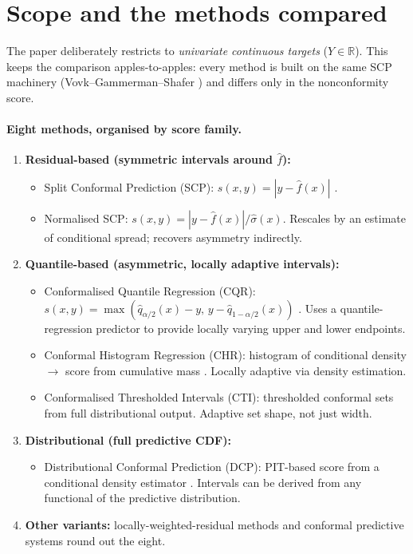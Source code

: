 \documentclass[letterpaper,11pt,leqno]{article}
\begin{document}
\section{Scope and the methods compared}\label{s:scope}

The paper deliberately restricts to \emph{univariate continuous targets} ($Y \in \mathbb{R}$). This keeps the comparison apples-to-apples: every method is built on the same SCP machinery (Vovk--Gammerman--Shafer \cite{vovk2005algorithmic}) and differs only in the nonconformity score.

\paragraph{Eight methods, organised by score family.}

\begin{enumerate}
\item \textbf{Residual-based (symmetric intervals around $\hat{f}$):}
\begin{itemize}
\item Split Conformal Prediction (SCP): $s(x, y) = |y - \hat{f}(x)|$ \cite{lei2018distribution}.
\item Normalised SCP: $s(x, y) = |y - \hat{f}(x)| / \hat{\sigma}(x)$. Rescales by an estimate of conditional spread; recovers asymmetry indirectly.
\end{itemize}

\item \textbf{Quantile-based (asymmetric, locally adaptive intervals):}
\begin{itemize}
\item Conformalised Quantile Regression (CQR): $s(x, y) = \max(\hat{q}_{\alpha/2}(x) - y, \, y - \hat{q}_{1-\alpha/2}(x))$ \cite{romano2019cqr}. Uses a quantile-regression predictor to provide locally varying upper and lower endpoints.
\item Conformal Histogram Regression (CHR): histogram of conditional density $\to$ score from cumulative mass \cite{sesia2021chr}. Locally adaptive via density estimation.
\item Conformalised Thresholded Intervals (CTI): thresholded conformal sets from full distributional output. Adaptive set shape, not just width.
\end{itemize}

\item \textbf{Distributional (full predictive CDF):}
\begin{itemize}
\item Distributional Conformal Prediction (DCP): PIT-based score from a conditional density estimator \cite{chernozhukov2021distributional}. Intervals can be derived from any functional of the predictive distribution.
\end{itemize}

\item \textbf{Other variants:} locally-weighted-residual methods and conformal predictive systems round out the eight.
\end{enumerate}
\end{document}
